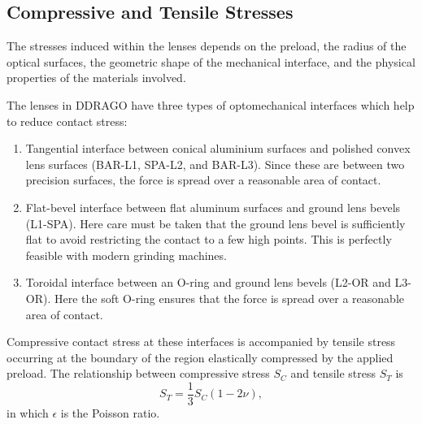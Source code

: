\documentclass{article}
\begin{document}



\subsection{Compressive and Tensile Stresses}

The stresses induced within the lenses depends on the preload, the radius of the optical surfaces, the geometric shape of the mechanical interface, and the physical properties of the materials involved. 

The lenses in DDRAGO have three types of optomechanical interfaces which help to reduce contact stress: 

\begin{enumerate}
\item
Tangential interface between conical aluminium surfaces and polished convex lens surfaces (BAR-L1, SPA-L2, and BAR-L3). Since these are between two precision surfaces, the force is spread over a reasonable area of contact.
\item
Flat-bevel interface between flat aluminum surfaces and ground lens bevels (L1-SPA). Here care must be taken that the ground lens bevel is sufficiently flat to avoid restricting the contact to a few high points. This is perfectly feasible with modern grinding machines.
\item
Toroidal interface between an O-ring and ground lens bevels (L2-OR and L3-OR). Here the soft O-ring ensures that the force is spread over a reasonable area of contact.
\end{enumerate}

Compressive contact stress at these interfaces is accompanied by tensile stress occurring at the boundary of the region elastically compressed by the applied preload. The relationship between compressive stress $S_C$ and tensile stress $S_T$ is
\begin{equation}
S_T = \frac{1}{3}S_C(1-2\nu),
\end{equation}
in which $\epsilon$ is the Poisson ratio.
\end{document}
